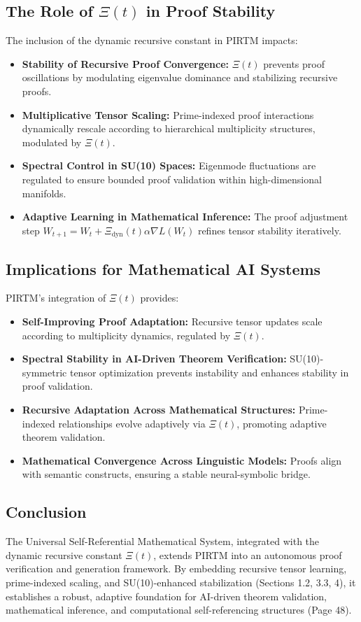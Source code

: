 \documentclass{article}
\theoremstyle{plain}
\begin{document}
\begin{itemize}
\subsection{The Role of \(\Xi(t) \) in Proof Stability}
The inclusion of the dynamic recursive constant in PIRTM impacts:
\begin{itemize}
    \item \textbf{Stability of Recursive Proof Convergence:} \(\Xi(t) \) prevents proof oscillations by modulating eigenvalue dominance and stabilizing recursive proofs.
    \item \textbf{Multiplicative Tensor Scaling:} Prime-indexed proof interactions dynamically rescale according to hierarchical multiplicity structures, modulated by \(\Xi(t) \).
    \item \textbf{Spectral Control in SU(10) Spaces:} Eigenmode fluctuations are regulated to ensure bounded proof validation within high-dimensional manifolds.
    \item \textbf{Adaptive Learning in Mathematical Inference:} The proof adjustment step \( W_{t+1} = W_t + \Xi_{\text{dyn}}(t) \alpha \nabla L(W_t) \) refines tensor stability iteratively.
\end{itemize}

\subsection{Implications for Mathematical AI Systems}
PIRTM’s integration of \(\Xi(t) \) provides:
\begin{itemize}
    \item \textbf{Self-Improving Proof Adaptation:} Recursive tensor updates scale according to multiplicity dynamics, regulated by \(\Xi(t) \).
    \item \textbf{Spectral Stability in AI-Driven Theorem Verification:} SU(10)-symmetric tensor optimization prevents instability and enhances stability in proof validation.
    \item \textbf{Recursive Adaptation Across Mathematical Structures:} Prime-indexed relationships evolve adaptively via \(\Xi(t) \), promoting adaptive theorem validation.
    \item \textbf{Mathematical Convergence Across Linguistic Models:} Proofs align with semantic constructs, ensuring a stable neural-symbolic bridge.
\end{itemize}

\subsection{Conclusion}
The Universal Self-Referential Mathematical System, integrated with the dynamic recursive constant \(\Xi(t) \), extends PIRTM into an autonomous proof verification and generation framework. By embedding recursive tensor learning, prime-indexed scaling, and SU(10)-enhanced stabilization (Sections 1.2, 3.3, 4), it establishes a robust, adaptive foundation for AI-driven theorem validation, mathematical inference, and computational self-referencing structures (Page 48).



\end{itemize}
\end{document}
